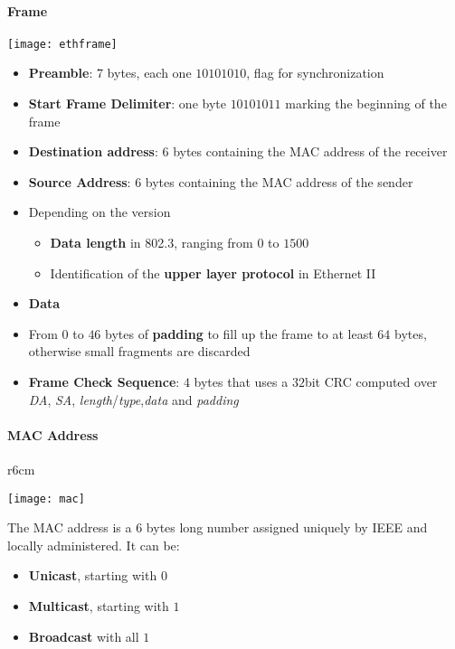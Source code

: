 \paragraph{Frame}
\begin{center}
	\texttt{[image: ethframe]}
\end{center}
\begin{itemize}
	\item \textbf{Preamble}: 7 bytes, each one $10101010$, flag for synchronization
	\item \textbf{Start Frame Delimiter}: one byte $10101011$ marking the beginning of the frame
	\item \textbf{Destination address}: $6$ bytes containing the MAC address of the receiver
	\item \textbf{Source Address}: $6$ bytes containing the MAC address of the sender
	\item Depending on the version
	\begin{itemize}
		\item \textbf{Data length} in 802.3, ranging from $0$ to $1500$
		\item Identification of the \textbf{upper layer protocol} in Ethernet II
	\end{itemize}
	\item \textbf{Data}
	\item From $0$ to $46$ bytes of \textbf{padding} to fill up the frame to at least $64$ bytes, otherwise small fragments are discarded
	\item \textbf{Frame Check Sequence}: $4$ bytes that uses a $32$bit CRC computed over \textit{DA}, \textit{SA}, \textit{length}/\textit{type},\textit{data} and \textit{padding}
\end{itemize}

\paragraph{MAC Address}
\begin{wrapfigure}[5]{r}{6cm}
	\vspace{-.5cm}
	\begin{center}
		\texttt{[image: mac]}
	\end{center}
\end{wrapfigure}
The MAC address is a $6$ bytes long number assigned uniquely by IEEE and locally administered. It can be:
\begin{itemize}
	\item \textbf{Unicast}, starting with $0$
	\item \textbf{Multicast}, starting with $1$
	\item \textbf{Broadcast} with all $1$
\end{itemize}

